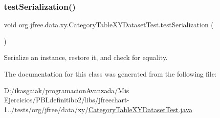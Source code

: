\subsubsection{\texorpdfstring{test\+Serialization()}{testSerialization()}}
{\footnotesize\ttfamily void org.\+jfree.\+data.\+xy.\+Category\+Table\+X\+Y\+Dataset\+Test.\+test\+Serialization (\begin{DoxyParamCaption}{ }\end{DoxyParamCaption})}

Serialize an instance, restore it, and check for equality. 

The documentation for this class was generated from the following file\+:\begin{DoxyCompactItemize}
\item 
D\+:/ikasgaiak/programacion\+Avanzada/\+Mis Ejercicios/\+P\+B\+Ldefinitibo2/libs/jfreechart-\/1../tests/org/jfree/data/xy/\mbox{\hyperlink{_category_table_x_y_dataset_test_8java}{Category\+Table\+X\+Y\+Dataset\+Test.\+java}}\end{DoxyCompactItemize}

